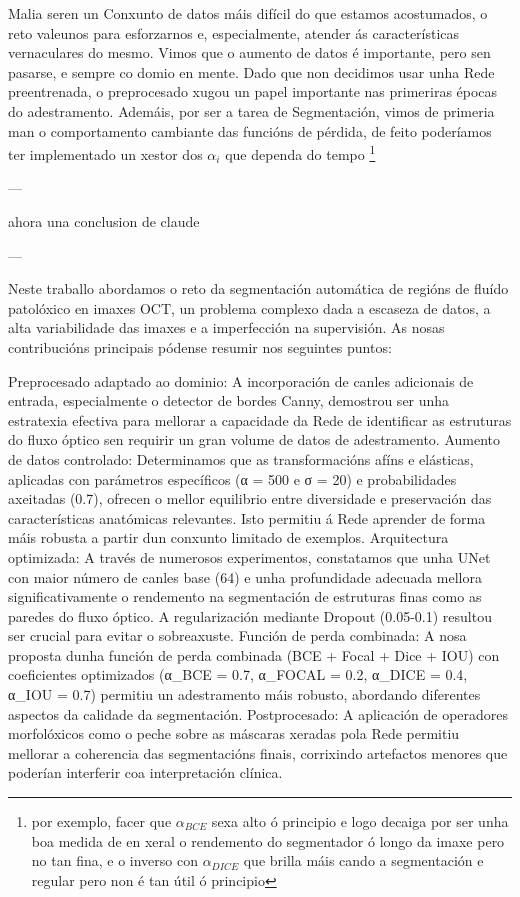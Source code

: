 \documentclass{article}
\begin{document}
Malia seren un Conxunto de datos máis difícil do que estamos acostumados, o reto valeunos para esforzarnos e, especialmente, atender ás características vernaculares do mesmo. Vimos que o aumento de datos é importante, pero sen pasarse, e sempre co domio en mente. Dado que non decidimos usar unha Rede preentrenada, o preprocesado xugou un papel importante nas primeriras épocas do adestramento. Ademáis, por ser a tarea de Segmentación, vimos de primeria man o comportamento cambiante das funcións de pérdida, de feito poderíamos ter implementado un xestor dos $\alpha_i$ que dependa do tempo \footnote{por exemplo, facer que $\alpha_{BCE}$ sexa alto ó principio e logo decaiga por ser unha boa medida de en xeral o rendemento do segmentador ó longo da imaxe pero no tan fina, e o inverso con $\alpha_{DICE}$ que brilla máis cando a segmentación e regular pero non é tan útil ó principio}


---

ahora una conclusion de claude 

---

Neste traballo abordamos o reto da segmentación automática de regións de fluído patolóxico en imaxes OCT, un problema complexo dada a escaseza de datos, a alta variabilidade das imaxes e a imperfección na supervisión. As nosas contribucións principais pódense resumir nos seguintes puntos:

Preprocesado adaptado ao dominio: A incorporación de canles adicionais de entrada, especialmente o detector de bordes Canny, demostrou ser unha estratexia efectiva para mellorar a capacidade da Rede de identificar as estruturas do fluxo óptico sen requirir un gran volume de datos de adestramento.
Aumento de datos controlado: Determinamos que as transformacións afíns e elásticas, aplicadas con parámetros específicos (α = 500 e σ = 20) e probabilidades axeitadas (0.7), ofrecen o mellor equilibrio entre diversidade e preservación das características anatómicas relevantes. Isto permitiu á Rede aprender de forma máis robusta a partir dun conxunto limitado de exemplos.
Arquitectura optimizada: A través de numerosos experimentos, constatamos que unha UNet con maior número de canles base (64) e unha profundidade adecuada mellora significativamente o rendemento na segmentación de estruturas finas como as paredes do fluxo óptico. A regularización mediante Dropout (0.05-0.1) resultou ser crucial para evitar o sobreaxuste.
Función de perda combinada: A nosa proposta dunha función de perda combinada (BCE + Focal + Dice + IOU) con coeficientes optimizados (α_BCE = 0.7, α_FOCAL = 0.2, α_DICE = 0.4, α_IOU = 0.7) permitiu un adestramento máis robusto, abordando diferentes aspectos da calidade da segmentación.
Postprocesado: A aplicación de operadores morfolóxicos como o peche sobre as máscaras xeradas pola Rede permitiu mellorar a coherencia das segmentacións finais, corrixindo artefactos menores que poderían interferir coa interpretación clínica.
\end{document}
